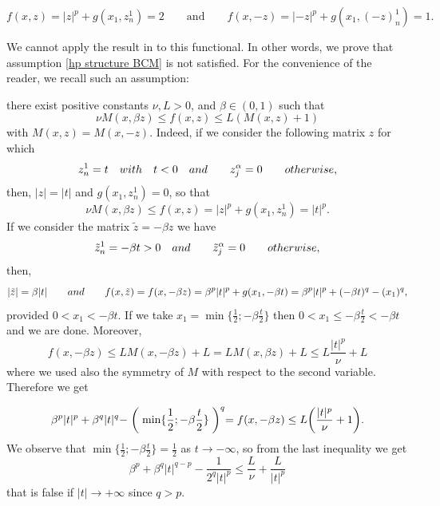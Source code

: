 \documentclass[a4paper,10pt]{article}
\theoremstyle{plain}
\theoremstyle{definition}
\numberwithin{equation}{section} \makeatletter
\begin{document}
$$f(x,z)=|z|^p+ g(x_1,z_n^1)=2 \qquad \text{and} \qquad f(x,-z)=|-z|^p+ g(x_1,(-z)_n^1)=1 . $$

\vspace{.2cm}
\noindent We cannot apply the result in \cite{BCM} to this functional. In other words, we prove that assumption \eqref{hp structure BCM} is not satisfied. For the convenience of the reader, we recall such an assumption:

\noindent  there exist positive constants $\nu,L >0$, and $\beta \in (0,1)$  such that
\begin{equation*}
 \nu M(x,\beta z)\le f(x,z) \le L(M(x,z)+1)
\end{equation*}
with $M(x,z)=M(x,-z)$. Indeed, if we consider the following matrix $z$ for which
\[
z_n^1=t \quad {\rm with } \quad t<0 \quad {\rm and } \qquad z_j^{\alpha}=0 \qquad {\rm otherwise,}
\]
then, $|z|=|t|$ and $g(x_1, z_n^1)=0$, so that
\[
\nu M(x,\beta z)\le f(x,z)=|z|^p+g(x_1, z_n^1)=|t|^p.
\]
If we consider the matrix $\tilde{z}=-\beta z$ we have
\[
\tilde{z}_n^1=- \beta t>0 \quad {\rm and } \qquad \tilde{z}_j^{\alpha}=0 \qquad {\rm otherwise,}
\]
then,
\[
|\tilde{z}|=\beta |t| \qquad {\rm and} \qquad f(x, \tilde{z})= f(x, - \beta z)=\beta^p |t|^p+g(x_1, - \beta t) = 
\beta^p |t|^p+(- \beta t)^q -(x_1)^q,
\]
provided $0<x_1<-\beta t$. If we take $x_1= \min \{\frac{1}{2}; -\beta \frac t 2 \}$ then $0<x_1 \le -\beta \frac t 2 < - \beta t$ and we are done. Moreover,
$$ f(x, - \beta z)\le L M(x,-\beta z)+L=L M(x,\beta z)+L \le L\frac{|t|^p}{\nu}+L$$
where we used also the symmetry of $M$ with respect to the second variable. Therefore we get

\[
\beta^p |t|^p+ \beta^q |t|^q -\biggm( \min \{\frac{1}{2}; -\beta \frac t 2 \}\biggm)^q = f(x,- \beta z)\le  L\bigg( \frac{|t|^p}{\nu}+1\bigg).
\]
We observe that $\min \{\frac{1}{2}; -\beta \frac t 2 \}=\frac{1}{2}$ as $t \to - \infty$, so from the last inequality we get
$$\beta^p + \beta^q |t|^{q-p} - \frac{1}{2^q |t|^p} \le  \frac{L}{\nu} +\frac{L}{|t|^p}$$
that is false if $|t| \rightarrow +\infty$ since $q>p$.
\end{document}
